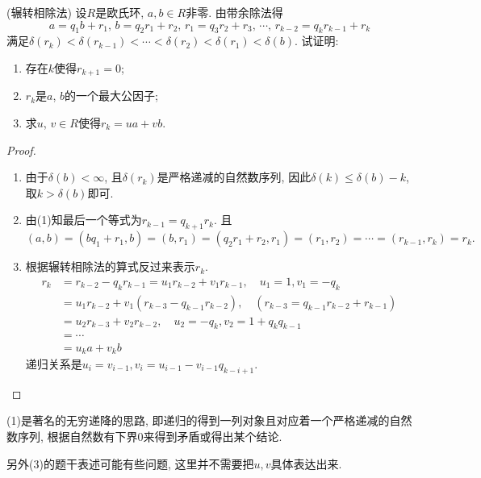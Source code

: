 \documentclass{../solutions-cn}
\begin{document}
\begin{exercise}[习题2.2.4]
    (辗转相除法) 设$R$是欧氏环, $a, b \in R$非零. 由带余除法得
    \[
        a = q_{1}b + r_{1},\, b = q_{2}r_{1} + r_{2},\, r_{1} = q_{3}r_{2} + r_{3},\, \cdots,\, r_{k- 2}= q_{k}r_{k- 1} + r_{k}
    \]
    满足$\delta(r_k) < \delta(r_{k - 1}) < \cdots < \delta(r_2) < \delta(r_1) < \delta(b)$. 试证明:
    \begin{enumerate}[(1)]
        \item 存在$k$使得$r_{k + 1} = 0$;
        \item $r_k$是$a$, $b$的一个最大公因子;
        \item 求$u$, $v \in R$使得$r_k = ua + vb$.
    \end{enumerate}
\end{exercise}

\begin{proof}
    \begin{enumerate}[(1)]
        \item 由于$\delta(b) < \infty$, 且$\delta(r_k)$是严格递减的自然数序列, 因此$\delta(k) \leqslant \delta(b) - k$, 取$k > \delta(b)$即可.
        \item 由(1)知最后一个等式为$r_{k - 1} = q_{k + 1}r_{k}$. 且
        \[
            (a, b) = (bq_1 + r_1, b) = (b, r_1) = (q_2r_1 + r_2, r_1) = (r_1, r_2) = \cdots = (r_{k - 1}, r_k) = r_k.
        \]
        \item 根据辗转相除法的算式反过来表示$r_k$.
        \[
        \begin{aligned}
            r_k &= r_{k - 2} - q_kr_{k - 1} = u_1r_{k - 2} + v_1r_{k - 1},\quad u_1 = 1, v_1 = -q_k\\
            &= u_1r_{k - 2} + v_1(r_{k - 3} - q_{k - 1}r_{k - 2}),\quad (r_{k - 3} = q_{k - 1}r_{k - 2} + r_{k - 1})\\
            &= u_2r_{k - 3} + v_2r_{k - 2}, \quad u_2 = -q_k, v_2 = 1 + q_kq_{k - 1}\\
            &= \cdots \\
            &= u_ka + v_kb
        \end{aligned}
        \]
        递归关系是$u_i = v_{i - 1}, v_i = u_{i - 1} - v_{i - 1}q_{k - i + 1}$.
    \end{enumerate}
\end{proof}

\begin{remark}
    (1)是著名的无穷递降的思路, 即递归的得到一列对象且对应着一个严格递减的自然数序列, 根据自然数有下界$0$来得到矛盾或得出某个结论.

    另外(3)的题干表述可能有些问题, 这里并不需要把$u, v$具体表达出来.
\end{remark}
\end{document}
